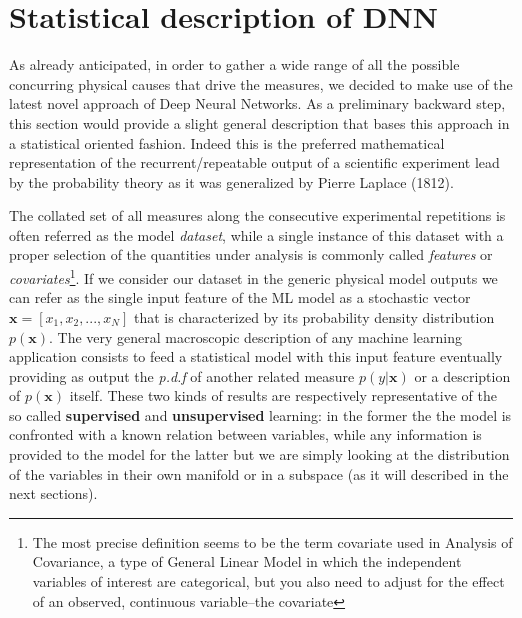\section{Statistical description of DNN}

As already anticipated, in order to gather a wide range of all the possible concurring physical causes that drive the measures, we decided to make use of the latest novel approach of Deep Neural Networks. As a preliminary backward step, this section would provide a slight general description that bases this approach in a statistical oriented fashion. Indeed this is the preferred mathematical representation of the recurrent/repeatable output of a scientific experiment lead by the probability theory as it was generalized by Pierre Laplace (1812). 

The collated set of all measures along the consecutive experimental repetitions is often referred as the model \textit{dataset}, while a single instance of this dataset with a proper selection of the quantities under analysis is commonly called \textit{features} or \textit{covariates}\footnote{The most precise definition seems to be the term covariate used in Analysis of Covariance, a type of General Linear Model in which the independent variables of interest are categorical, but you also need to adjust for the effect of an observed, continuous variable–the covariate}.
%
If we consider our dataset in the generic physical model outputs we can refer as the single input feature of the ML model as a stochastic vector $\bm{x} = [x_1,x_2, ... ,x_N]$ that is characterized by its probability density distribution $p(\bm{x})$. The very general macroscopic description of any machine learning application consists to feed a statistical model with this input feature eventually providing as output the \textit{p.d.f} of another related measure $p(y|\bm{x})$ or a description of $p(\bm{x})$ itself. These two kinds of results are respectively representative of the so called  \textbf{supervised} and \textbf{unsupervised} learning: in the former the the model is confronted with a known relation between variables, while any information is provided to the model for the latter but we are simply looking at the distribution of the variables in their own manifold or in a subspace (as it will described in the next sections).

